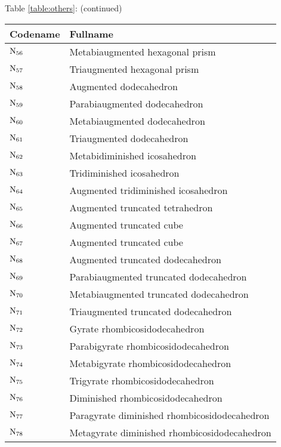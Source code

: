 \begin{table}[htbp]
\begin{center}
Table \ref{table:others}: (continued)

\vspace{4mm}
\begin{tabular}{l|l} \hline
Codename & Fullname \\ \hline
$\mbox{N$_{56}$}$ & Meta\-bi\-augmented hexagonal prism \\
$\mbox{N$_{57}$}$ & Tri\-augmented hexagonal prism \\
$\mbox{N$_{58}$}$ & Augmented dodeca\-hedron \\
$\mbox{N$_{59}$}$ & Para\-bi\-augmented dodeca\-hedron \\
$\mbox{N$_{60}$}$ & Meta\-bi\-augmented dodeca\-hedron \\
$\mbox{N$_{61}$}$ & Tri\-augmented dodeca\-hedron \\
$\mbox{N$_{62}$}$ & Meta\-bi\-diminished icosahedron \\
$\mbox{N$_{63}$}$ & Tri\-diminished icosahedron \\
$\mbox{N$_{64}$}$ & Augmented tridiminished icosahedron \\
$\mbox{N$_{65}$}$ & Augmented truncated tetrahedron \\
$\mbox{N$_{66}$}$ & Augmented truncated cube \\
$\mbox{N$_{67}$}$ & Augmented truncated cube \\
$\mbox{N$_{68}$}$ & Augmented truncated dodeca\-hedron \\
$\mbox{N$_{69}$}$ & Para\-bi\-augmented truncated dodeca\-hedron \\
$\mbox{N$_{70}$}$ & Meta\-bi\-augmented truncated dodeca\-hedron \\
$\mbox{N$_{71}$}$ & Tri\-augmented truncated dodeca\-hedron \\
$\mbox{N$_{72}$}$ & Gyrate rhom\-bi\-cosi\-dodeca\-hedron \\
$\mbox{N$_{73}$}$ & Para\-bi\-gyrate rhom\-bi\-cosi\-dodeca\-hedron \\
$\mbox{N$_{74}$}$ & Meta\-bi\-gyrate rhom\-bi\-cosi\-dodeca\-hedron \\
$\mbox{N$_{75}$}$ & Tri\-gyrate rhom\-bi\-cosi\-dodeca\-hedron \\
$\mbox{N$_{76}$}$ & Diminished rhom\-bi\-cosi\-dodeca\-hedron \\
$\mbox{N$_{77}$}$ & Para\-gyrate diminished rhom\-bi\-cosi\-dodeca\-hedron \\
$\mbox{N$_{78}$}$ & Meta\-gyrate diminished rhom\-bi\-cosi\-dodeca\-hedron \\

\end{tabular}
\end{center}
\end{table}

